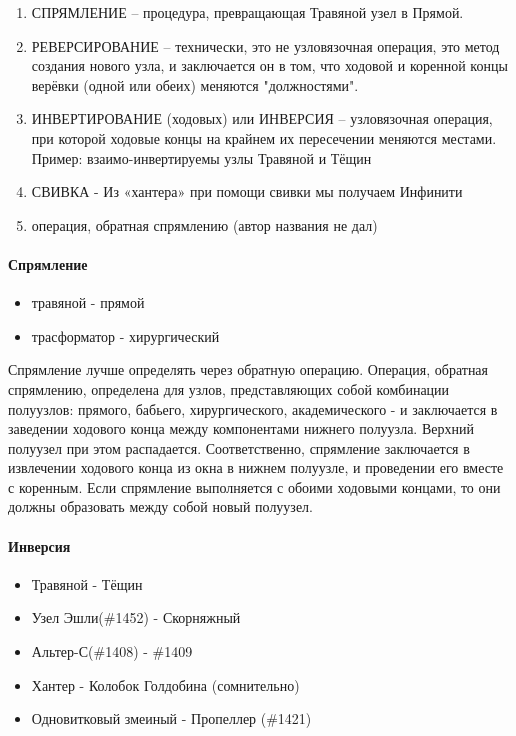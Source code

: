 \begin{enumerate}
\item СПРЯМЛЕНИЕ  – процедура, превращающая Травяной узел в Прямой. 
\item РЕВЕРСИРОВАНИЕ  – технически, это не узловязочная операция, это метод создания нового узла, и заключается он в том, что ходовой и коренной концы верёвки (одной или обеих) меняются "должностями".
\item ИНВЕРТИРОВАНИЕ (ходовых) или ИНВЕРСИЯ  – узловязочная операция, при которой ходовые концы на крайнем их пересечении меняются местами. Пример: взаимо-инвертируемы узлы Травяной и Тёщин 
\item СВИВКА - Из «хантера» при помощи свивки мы получаем Инфинити
\item операция, обратная спрямлению (автор названия не дал)
\end{enumerate}


\paragraph{Спрямление}
\begin{itemize}
\item травяной - прямой
\item трасформатор - хирургический
\end{itemize}

Спрямление лучше определять через обратную операцию. Операция, обратная спрямлению, определена для узлов, представляющих собой комбинации полуузлов: прямого, бабьего, хирургического, академического - и заключается в заведении ходового конца между компонентами нижнего полуузла. Верхний полуузел при этом распадается.
Соответственно, спрямление заключается в извлечении ходового конца из окна в нижнем полуузле, и проведении его вместе с коренным. Если спрямление выполняется с обоими ходовыми концами, то они должны образовать между собой новый полуузел.

\paragraph{Инверсия}
\begin{itemize}
\item Травяной - Тёщин
\item Узел Эшли(\#1452) - Скорняжный 
\item Альтер-С(\#1408) - \#1409
\item Хантер - Колобок Голдобина (сомнительно)
\item Одновитковый змеиный - Пропеллер (\#1421)
\end{itemize}


